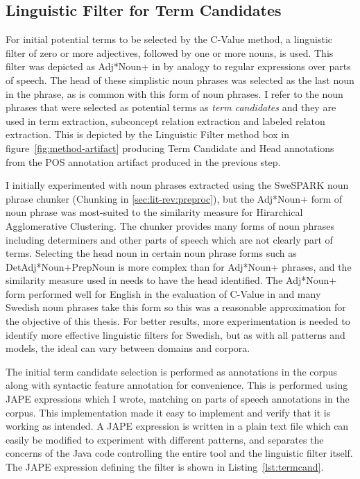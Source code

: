 \documentclass[a4paper]{report}
\newcommand{\todo}[1]{}
\begin{document}
\subsection{Linguistic Filter for Term Candidates}
\label{subsec:results:term_cand_ling_filt}

For initial potential terms to be selected by the C-Value method, a linguistic filter of zero or more adjectives, followed by one or more nouns, is used.
This filter was depicted as Adj*Noun+ in \cite{Frantzi98CNCValue} by analogy to regular expressions over parts of speech.
The head of these simplistic noun phrases was selected as the last noun in the phrase, as is common with this form of noun phrases.
I refer to the noun phrases that were selected as potential terms as \emph{term candidates} and they are used in term extraction, subconcept relation extraction and labeled relaton extraction.
This is depicted by the Linguistic Filter method box in figure~\ref{fig:method-artifact} producing Term Candidate and Head annotations from the POS annotation artifact produced in the previous step.

I initially experimented with noun phrases extracted using the SweSPARK noun phrase chunker (Chunking in \ref{sec:lit-rev:preproc}), but the Adj*Noun+ form of noun phrase was most-suited to the similarity measure for Hirarchical Agglomerative Clustering.
The chunker provides many forms of noun phrases including determiners and other parts of speech which are not clearly part of terms.
Selecting the head noun in certain noun phrase forms such as DetAdj*Noun+PrepNoun is more complex than for Adj*Noun+ phrases, and the similarity measure used in \cite{Drymonas10OntoGain} needs to have the head identified.
The Adj*Noun+ form performed well for English in the evaluation of C-Value in \cite{Frantzi98CNCValue} and many Swedish noun phrases take this form \todo{cite swedish noun phrase book} so this was a reasonable approximation for the objective of this thesis.
For better results, more experimentation is needed to identify more effective linguistic filters for Swedish, but as with all patterns and models, the ideal can vary between domains and corpora.

The initial term candidate selection is performed as annotations in the corpus along with syntactic feature annotation for convenience.
This is performed using JAPE expressions which I wrote, matching on parts of speech annotations in the corpus.
This implementation made it easy to implement and verify that it is working as intended.
A JAPE expression is written in a plain text file which can easily be modified to experiment with different patterns, and separates the concerns of the Java code controlling the entire tool and the linguistic filter itself.
The JAPE expression defining the filter is shown in Listing~\ref{lst:termcand}.
\end{document}
